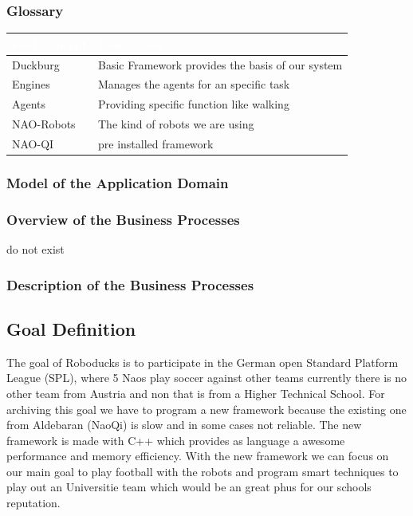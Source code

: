 \documentclass[12pt]{article}
\theoremstyle{definition}
\begin{document}
\pagebreak

\subsubsection{Glossary}
\begin{tabular}{|l|l|}
\hline
\cellcolor[gray]{0.5}\textcolor{white}{Fold Concept} & \cellcolor[gray]{0.5}\textcolor{white}{Description} \\ \hline
Duckburg&Basic Framework provides the basis of our system \\ \hline
Engines&Manages the agents for an specific task\\ \hline
Agents&Providing specific function like walking\\ \hline
NAO-Robots&The kind of robots we are using\\ \hline
NAO-QI&pre installed framework\\ \hline
\end{tabular}


\pagebreak
\subsubsection{Model of the Application Domain}


\subsubsection{Overview of the Business Processes}
do not exist

\subsubsection{Description of the Business Processes}

\subsection{Goal Definition}
The goal of Roboducks is to participate in the German open Standard Platform League (SPL), where 5 Naos play soccer against other teams currently there is no other team from Austria and non that is from a Higher Technical School. For archiving this goal we have to program a new framework because the existing one from Aldebaran (NaoQi) is slow and in some cases not reliable. The new framework is made with C++ which provides as language a awesome performance and memory efficiency. With the new framework we can focus on our main goal to play football with the robots and program smart techniques to play out an Universitie team which would be an great phus for our schools reputation.
\end{document}
